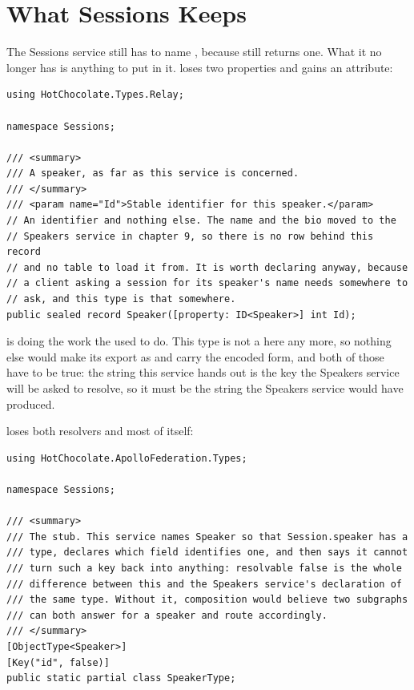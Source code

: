 \section{What Sessions Keeps}
\label{sec:ch09-what-sessions-keeps}

%
The Sessions service still has to name , because
 still returns one. What it no longer has is anything to
put in it.  loses two properties and gains an attribute:

\begin{verbatim}
using HotChocolate.Types.Relay;

namespace Sessions;

/// <summary>
/// A speaker, as far as this service is concerned.
/// </summary>
/// <param name="Id">Stable identifier for this speaker.</param>
// An identifier and nothing else. The name and the bio moved to the
// Speakers service in chapter 9, so there is no row behind this record
// and no table to load it from. It is worth declaring anyway, because
// a client asking a session for its speaker's name needs somewhere to
// ask, and this type is that somewhere.
public sealed record Speaker([property: ID<Speaker>] int Id);
\end{verbatim}

%
\code{[ID<Speaker>]} is doing the work the \code{[NodeResolver]} used to do.
This type is not a  here any more, so nothing else would make its
 export as  and carry the encoded form, and both of those
have to be true: the string this service hands out is the key the Speakers
service will be asked to resolve, so it must be the string the Speakers
service would have produced.

%
 loses both resolvers and most of itself:

\begin{verbatim}
using HotChocolate.ApolloFederation.Types;

namespace Sessions;

/// <summary>
/// The stub. This service names Speaker so that Session.speaker has a
/// type, declares which field identifies one, and then says it cannot
/// turn such a key back into anything: resolvable false is the whole
/// difference between this and the Speakers service's declaration of
/// the same type. Without it, composition would believe two subgraphs
/// can both answer for a speaker and route accordingly.
/// </summary>
[ObjectType<Speaker>]
[Key("id", false)]
public static partial class SpeakerType;
\end{verbatim}

